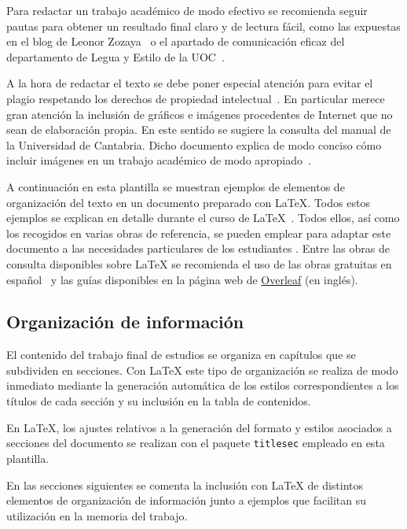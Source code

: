 Para redactar un trabajo académico de modo efectivo se recomienda seguir pautas para obtener un resultado final claro y de lectura fácil, como las expuestas en el blog de Leonor Zozaya~\cite{zozaya17} o el apartado de comunicación eficaz del departamento de Legua y Estilo de la UOC~\cite{uoc}.

A la hora de redactar el texto se debe poner especial atención para evitar el plagio respetando los derechos de propiedad intelectual~\cite{uc3m21}. En particular merece gran atención la inclusión de gráficos e imágenes procedentes de Internet que no sean de elaboración propia. En este sentido se sugiere la consulta del manual de la Universidad de Cantabria. Dicho documento explica de modo conciso cómo incluir imágenes en un trabajo académico de modo apropiado~\cite{unican18}.

A continuación en esta plantilla se muestran ejemplos de elementos de organización del texto en un documento preparado con \LaTeX{}. Todos estos ejemplos se explican en detalle durante el curso de \LaTeX{}~\cite{salido10}. Todos ellos, así como los recogidos en varias obras de referencia, se pueden emplear para adaptar este documento a las necesidades particulares de los estudiantes \cite{lamport94,grat99,cascales03,mittelbach04,grat07,goos07,wikibookLaTex10}. Entre las obras de consulta disponibles sobre \LaTeX{} se recomienda el uso de las obras gratuitas en español~\cite{oetiker14,borbon21} y las guías disponibles en la página web de \href{https://es.overleaf.com/learn}{Overleaf} (en inglés).




\subsection{Organización de información}
El contenido del trabajo final de estudios se organiza en capítulos que se subdividen en secciones. Con \LaTeX{} este tipo de organización se realiza de modo inmediato mediante la generación automática de los estilos correspondientes a los títulos de cada sección y su inclusión en la tabla de contenidos.

En \LaTeX{}, los ajustes relativos a la generación del formato y estilos asociados a secciones del documento se realizan con el paquete \texttt{titlesec} empleado en esta plantilla.

En las secciones siguientes se comenta la inclusión con \LaTeX{} de distintos elementos de organización de información junto a ejemplos que facilitan su  utilización en la memoria del trabajo.




